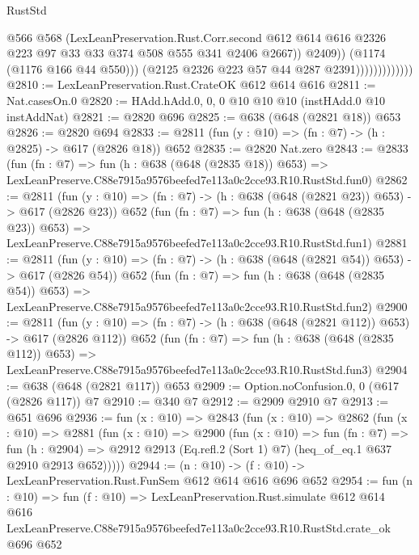 \begin{lexlean}{RustStd}
\begin{coremodule}
                                    @566
                                    @568
                                    (LexLeanPreservation.Rust.Corr.second
                                      @612
                                      @614
                                      @616
                                      @2326
                                      @223
                                      @97
                                      @33
                                      @33
                                      @374
                                      @508
                                      @555
                                      @341
                                      @2406
                                      @2667))
                                  @2409))
                              (@1174 (@1176 @166 @44 @550)))
                            (@2125 @2326 @223 @57 @44 @287 @2391)))))))))))))
@2810 := LexLeanPreservation.Rust.CrateOK @612 @614 @616
@2811 := Nat.casesOn.{0}
@2820 := HAdd.hAdd.{0, 0, 0} @10 @10 @10 (instHAdd.{0} @10 instAddNat)
@2821 := @2820 @696
@2825 := @638 (@648 (@2821 @18)) @653
@2826 := @2820 @694
@2833 := @2811 (fun (y : @10) => (fn : @7) -> (h : @2825) -> @617 (@2826 @18)) @652
@2835 := @2820 Nat.zero
@2843 := @2833
    (fun (fn : @7) =>
    fun (h : @638 (@648 (@2835 @18)) @653) =>
    LexLeanPreserve.C88e7915a9576beefed7e113a0c2cce93.R10.RustStd.fun0)
@2862 := @2811
    (fun (y : @10) => (fn : @7) -> (h : @638 (@648 (@2821 @23)) @653) -> @617 (@2826 @23))
    @652
    (fun (fn : @7) =>
    fun (h : @638 (@648 (@2835 @23)) @653) =>
    LexLeanPreserve.C88e7915a9576beefed7e113a0c2cce93.R10.RustStd.fun1)
@2881 := @2811
    (fun (y : @10) => (fn : @7) -> (h : @638 (@648 (@2821 @54)) @653) -> @617 (@2826 @54))
    @652
    (fun (fn : @7) =>
    fun (h : @638 (@648 (@2835 @54)) @653) =>
    LexLeanPreserve.C88e7915a9576beefed7e113a0c2cce93.R10.RustStd.fun2)
@2900 := @2811
    (fun (y : @10) => (fn : @7) -> (h : @638 (@648 (@2821 @112)) @653) -> @617 (@2826 @112))
    @652
    (fun (fn : @7) =>
    fun (h : @638 (@648 (@2835 @112)) @653) =>
    LexLeanPreserve.C88e7915a9576beefed7e113a0c2cce93.R10.RustStd.fun3)
@2904 := @638 (@648 (@2821 @117)) @653
@2909 := Option.noConfusion.{0, 0} (@617 (@2826 @117)) @7
@2910 := @340 @7
@2912 := @2909 @2910 @7
@2913 := @651 @696
@2936 := fun (x : @10) =>
  @2843
    (fun (x : @10) =>
    @2862
      (fun (x : @10) =>
      @2881
        (fun (x : @10) =>
        @2900
          (fun (x : @10) =>
          fun (fn : @7) =>
          fun (h : @2904) =>
          @2912 @2913 (Eq.refl.{2} (Sort 1) @7) (heq_of_eq.{1} @637 @2910 @2913 @652)))))
@2944 := (n : @10) -> (f : @10) -> LexLeanPreservation.Rust.FunSem @612 @614 @616 @696 @652
@2954 := fun (n : @10) =>
  fun (f : @10) =>
  LexLeanPreservation.Rust.simulate
    @612
    @614
    @616
    LexLeanPreserve.C88e7915a9576beefed7e113a0c2cce93.R10.RustStd.crate_ok
    @696
    @652
\end{coremodule}
\end{lexlean}
